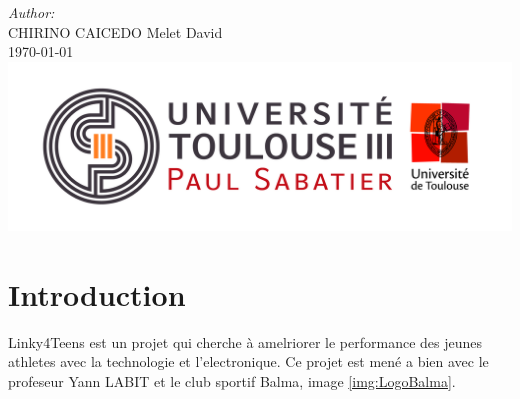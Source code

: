 \documentclass[12pt]{article}
\begin{document}
\begin{titlepage}
\Large \emph{Author:}\\
\textsc{CHIRINO CAICEDO} Melet David \\[2cm] %


{\large \today}\\[2cm] %


\includegraphics[width=6in]{img/Logo_UT3.jpg}\\[2cm] %
 

\vfill %

\end{titlepage}

\tableofcontents

\newpage


\section{Introduction}
Linky4Teens est un projet qui cherche \`a amelriorer le performance des jeunes athletes avec la technologie et l'electronique. Ce projet est men\'e a bien avec le profeseur Yann LABIT et le club sportif Balma, image \ref{img:LogoBalma}.
\end{document}
